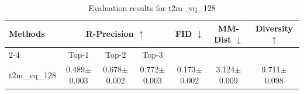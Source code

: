 \begin{table}[h]
\centering
\begin{tabular}{l ccc ccc}
\toprule
\multirow{2}{*}{\textbf{Methods}} & \multicolumn{3}{c}{\textbf{R-Precision $\uparrow$}} & \multirow{2}{*}{\textbf{FID $\downarrow$}} & \multirow{2}{*}{\textbf{MM-Dist $\downarrow$}} & \multirow{2}{*}{\textbf{Diversity $\uparrow$}} \\
\cmidrule(lr){2-4}
& Top-1 & Top-2 & Top-3 & & & \\
\midrule
t2m_vq_128 & 0.489$\pm$0.003 & 0.678$\pm$0.002 & 0.772$\pm$0.003 & 0.173$\pm$0.002 & 3.124$\pm$0.009 & 9.711$\pm$0.098 \\
\bottomrule
\end{tabular}
\caption{Evaluation results for t2m_vq_128}
\label{tab:results_t2m_vq_128}
\end{table}
